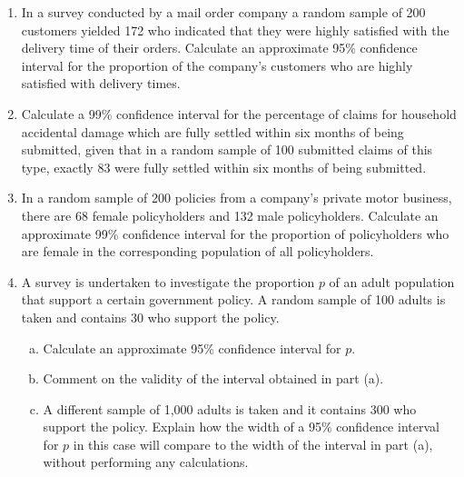 \documentclass[a4paper,12pt]{article}
\begin{document}


\begin{enumerate}

\item In a survey conducted by a mail order company a random sample of 200 customers yielded 172 who indicated that they were highly satisfied with the delivery time of their orders.
Calculate an approximate 95\% confidence interval for the proportion of the
company's customers who are highly satisfied with delivery times.




\item  Calculate a 99\% confidence interval for the percentage of claims for household accidental damage which are fully settled within six months of being submitted, given
that in a random sample of 100 submitted claims of this type, exactly 83 were fully settled within six months of being submitted.




\item  In a random sample of 200 policies from a company’s private motor business, there are 68 female policyholders and 132 male policyholders.
Calculate an approximate 99\% confidence interval for the proportion of policyholders who are female in the corresponding population of all policyholders.



\item A survey is undertaken to investigate the proportion $p$ of an adult population that
support a certain government policy. A random sample of 100 adults is taken and
contains 30 who support the policy.
\begin{enumerate}[(a)]
\item  Calculate an approximate 95\% confidence interval for $p$. 
\item  Comment on the validity of the interval obtained in part (a). 
\item A different sample of 1,000 adults is taken and it contains 300 who support the policy.
Explain how the width of a 95\% confidence interval for $p$ in this case will
compare to the width of the interval in part (a), without performing any
calculations.
\end{enumerate}


\end{enumerate}
\end{document}
